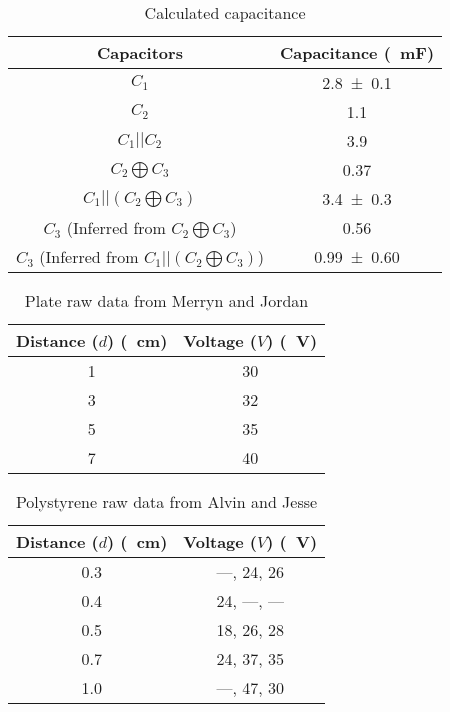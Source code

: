 \documentclass[a4paper]{scrartcl}
\begin{document}
\begin{table}
    \centering
    \begin{tabular}{c | c}
        Capacitors & Capacitance (\SI{}{\milli\farad}) \\
        \hline
        \(C_1\) & \SI{2.8 \pm 0.1}{} \\
        \(C_2\) & \SI{1.1}{} \\
        \(C_1 || C_2\) & \SI{3.9}{} \\
        \(C_2 \bigoplus C_3\) & \SI{0.37}{} \\
        \(C_1 || (C_2 \bigoplus C_3)\) & \SI{3.4 \pm 0.3}{} \\
        \(C_3\) (Inferred from \(C_2 \bigoplus C_3\)) & \SI{0.56}{} \\
        \(C_3\) (Inferred from \(C_1 || (C_2 \bigoplus C_3)\)) & \SI{0.99 \pm 0.60}{} \\
        \hline
    \end{tabular}
    \caption{Calculated capacitance}
    \label{tab:calculated_capacitance}
\end{table}

\begin{table}
    \centering
    \begin{tabular}{c | c}
        Distance (\(d\)) (\SI{}{\centi\meter}) & Voltage (\(V\)) (\SI{}{\volt}) \\
        \hline
        \SI{1}{} & \SI{30}{} \\
        \SI{3}{} & \SI{32}{} \\
        \SI{5}{} & \SI{35}{} \\
        \SI{7}{} & \SI{40}{} \\
        \hline
    \end{tabular}
    \caption{Plate raw data from Merryn and Jordan}
    \label{tab:plate_data}
\end{table}

\begin{table}
    \centering
    \begin{tabular}{c | c}
        Distance (\(d\)) (\SI{}{\centi\meter}) & Voltage (\(V\)) (\SI{}{\volt}) \\
        \hline
        \SI{0.3}{} & ---, \SI{24}{}, \SI{26}{} \\
        \SI{0.4}{} & \SI{24}{}, ---, --- \\
        \SI{0.5}{} & \SI{18}{}, \SI{26}{}, \SI{28}{} \\
        \SI{0.7}{} & \SI{24}{}, \SI{37}{}, \SI{35}{} \\
        \SI{1.0}{} & ---, \SI{47}{}, \SI{30}{} \\
        \hline
    \end{tabular}
    \caption{Polystyrene raw data from Alvin and Jesse}
    \label{tab:polystyrene_data}
\end{table}
\end{document}
